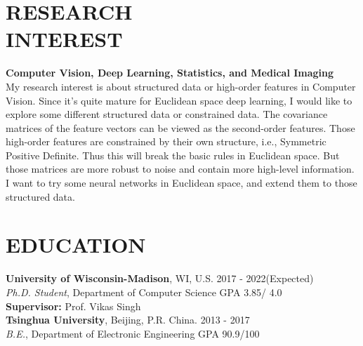 \documentclass[margin]{res}
\begin{document}
\begin{resume}
\vspace{-2em}
\section{RESEARCH \\ INTEREST}
                \textbf{Computer Vision, Deep Learning, Statistics, and Medical Imaging}\\
                My research interest is about structured data or high-order features in Computer Vision. Since it's quite mature for Euclidean space deep learning, I would like to explore some different structured data or constrained data. The covariance matrices of the feature vectors can be viewed as the second-order features. Those high-order features are constrained by their own structure, i.e., Symmetric Positive Definite. Thus this will break the basic rules in Euclidean space. But those matrices are more robust to noise and contain more high-level information. I want to try some neural networks in Euclidean space, and extend them to those structured data.
                
\vspace{-1em}
\section{EDUCATION} 
                {\bf University of Wisconsin-Madison}, WI, U.S. \hfill 2017 - 2022(Expected)\\
                {\sl {Ph.D. Student}}, Department of Computer Science \hfill GPA 3.85/ 4.0\\
                {\bf Supervisor:} Prof. Vikas Singh\\
                {\bf Tsinghua University}, Beijing, P.R. China. \hfill 2013 - 2017\\
                {\sl {B.E.}}, Department of Electronic Engineering \hfill GPA 90.9/100

\vspace{-1em}                

\end{resume}
\end{document}
